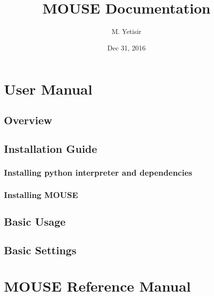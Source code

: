 \documentclass[letterpaper,10pt,english]{sphinxmanual}
\title{MOUSE Documentation}
\date{Dec 31, 2016}
\author{M. Yetisir}
\begin{document}
\maketitle
\sphinxtableofcontents
{}\label{\detokenize{index::doc}}



\chapter{User Manual}
\label{\detokenize{UserManual:user-manual}}\label{\detokenize{UserManual::doc}}\label{\detokenize{UserManual:welcome-to-mouse-s-documentation}}

\section{Overview}
\label{\detokenize{UserManual:overview}}

\section{Installation Guide}
\label{\detokenize{UserManual:installation-guide}}

\subsection{Installing python interpreter and dependencies}
\label{\detokenize{UserManual:installing-python-interpreter-and-dependencies}}

\subsection{Installing MOUSE}
\label{\detokenize{UserManual:installing-mouse}}

\section{Basic Usage}
\label{\detokenize{UserManual:basic-usage}}

\section{Basic Settings}
\label{\detokenize{UserManual:basic-settings}}

\chapter{MOUSE Reference Manual}
\label{\detokenize{MouseReferenceManual::doc}}\label{\detokenize{MouseReferenceManual:mouse-reference-manual}}
\end{document}
